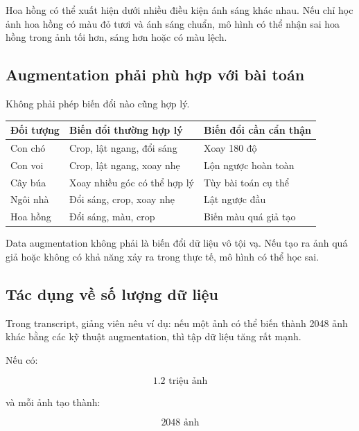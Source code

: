 \begin{vidu}
Hoa hồng có thể xuất hiện dưới nhiều điều kiện ánh sáng khác nhau. Nếu chỉ học ảnh hoa hồng có màu đỏ tươi và ánh sáng chuẩn, mô hình có thể nhận sai hoa hồng trong ảnh tối hơn, sáng hơn hoặc có màu lệch.
\end{vidu}

\subsection{Augmentation phải phù hợp với bài toán}

Không phải phép biến đổi nào cũng hợp lý.

\begin{center}
\begin{tabular}{p{}p{}p{}}
\toprule
Đối tượng & Biến đổi thường hợp lý & Biến đổi cần cẩn thận \\
\midrule
Con chó & Crop, lật ngang, đổi sáng & Xoay 180 độ \\
Con voi & Crop, lật ngang, xoay nhẹ & Lộn ngược hoàn toàn \\
Cây búa & Xoay nhiều góc có thể hợp lý & Tùy bài toán cụ thể \\
Ngôi nhà & Đổi sáng, crop, xoay nhẹ & Lật ngược đầu \\
Hoa hồng & Đổi sáng, màu, crop & Biến màu quá giả tạo \\
\bottomrule
\end{tabular}
\end{center}

\begin{canhbao}
Data augmentation không phải là biến đổi dữ liệu vô tội vạ. Nếu tạo ra ảnh quá giả hoặc không có khả năng xảy ra trong thực tế, mô hình có thể học sai.
\end{canhbao}

\subsection{Tác dụng về số lượng dữ liệu}

Trong transcript, giảng viên nêu ví dụ: nếu một ảnh có thể biến thành 2048 ảnh khác bằng các kỹ thuật augmentation, thì tập dữ liệu tăng rất mạnh.

Nếu có:

\[
    1.2 \text{ triệu ảnh}
\]

và mỗi ảnh tạo thành:

\[
    2048 \text{ ảnh}
\]

